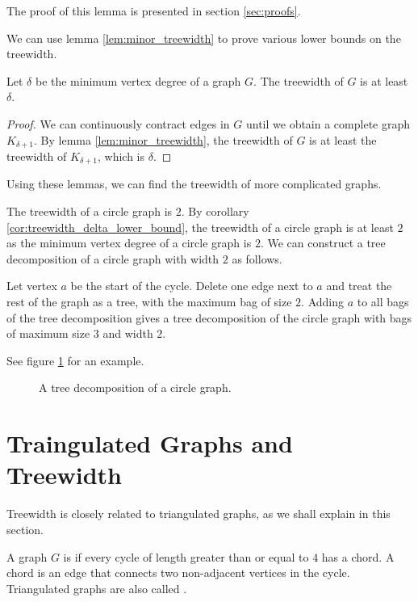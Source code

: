 The proof of this lemma is presented in section \ref{sec:proofs}.

We can use lemma \ref{lem:minor_treewidth} to prove various lower bounds on the treewidth. 

\begin{corollary}\label{cor:treewidth_delta_lower_bound}
	Let $\delta$ be the minimum vertex degree of a graph $G$. The treewidth of $G$ is at least $\delta$.
\end{corollary}

\begin{proof}
	We can continuously contract edges in $G$ until we obtain a complete graph $K_{\delta + 1}$. By lemma \ref{lem:minor_treewidth}, the treewidth of $G$ is at least the treewidth of $K_{\delta + 1}$, which is $\delta$.
\end{proof}

Using these lemmas, we can find the treewidth of more complicated graphs.

\begin{example}
	The treewidth of a circle graph is $2$.
	By corollary \ref{cor:treewidth_delta_lower_bound}, the treewidth of a circle graph is at least $2$ as the minimum vertex degree of a circle graph is $2$.
	We can construct a tree decomposition of a circle graph with width $2$ as follows.

	Let vertex $a$ be the start of the cycle. Delete one edge next to $a$ and treat the rest of the graph as a tree, with the maximum bag of size $2$.
	Adding $a$ to all bags of the tree decomposition gives a tree decomposition of the circle graph with bags of maximum size $3$ and width $2$.

	See figure \ref{fig:tree_decomposition_of_circle_graph} for an example.
\end{example}

\begin{figure}[ht]
	\centering
	
	\caption{A tree decomposition of a circle graph.}
	\label{fig:tree_decomposition_of_circle_graph}
\end{figure}

\section{Traingulated Graphs and Treewidth}

Treewidth is closely related to triangulated graphs, as we shall explain in this section.

\begin{definition}
	A graph $G$ is  if every cycle of length greater than or equal to $4$ has a chord.
	A chord is an edge that connects two non-adjacent vertices in the cycle.
	Triangulated graphs are also called .
\end{definition}


